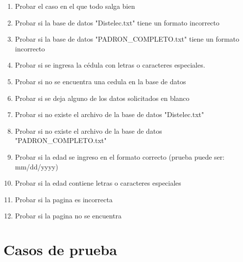 \documentclass[conference]{IEEEtran}
\begin{document}
\begin{enumerate}

\item Probar el caso en el que todo salga bien

\item Probar si la base de datos "Distelec.txt" tiene un formato incorrecto

\item Probar si la base de datos "PADRON\_COMPLETO.txt" tiene un formato incorrecto

\item Probar si se ingresa la cédula con letras o caracteres especiales.

\item Probar si no se encuentra una cedula en la base de datos

\item Probar si se deja alguno de los datos solicitados en blanco

\item Probar si no existe el archivo de la base de datos "Distelec.txt"

\item Probar si no existe el archivo de la base de datos "PADRON\_COMPLETO.txt"

\item Probar si la edad se ingreso en el formato correcto (prueba puede ser: mm/dd/yyyy)

\item Probar si la edad contiene letras o caracteres especiales

\item Probar si la pagina es incorrecta 

\item Probar si la pagina no se encuentra

\end{enumerate}


\section{Casos de prueba}
\end{document}
